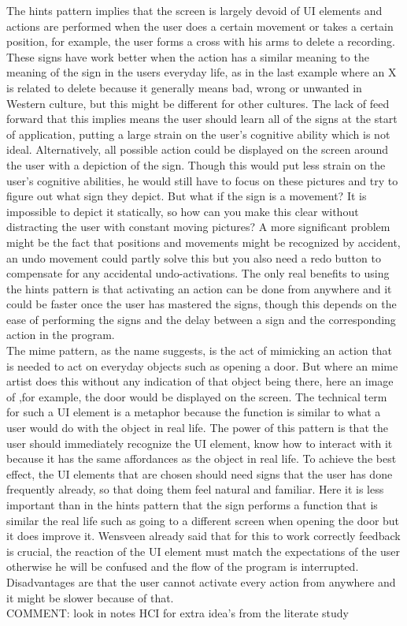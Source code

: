 The hints pattern implies that the screen is largely devoid of UI elements and actions are performed when the user does a certain movement or takes a certain position, for example, the user forms a cross with his arms to delete a recording. These signs have work better when the action has a similar meaning to the meaning of the sign in the users everyday life, as in the last example where an X is related to delete because it generally means bad, wrong or unwanted in Western culture, but this might be different for other cultures. The lack of feed forward that this implies means the user should learn all of the signs at the start of application, putting a large strain on the user's cognitive ability which is not ideal. Alternatively, all possible action could be displayed on the screen around the user with a depiction of the sign. Though this would put less strain on the user's cognitive abilities, he would still have to focus on these pictures and try to figure out what sign they depict. But what if the sign is a movement? It is impossible to depict it statically, so how can you make this clear without distracting the user with constant moving pictures? A more significant problem might be the fact that positions and movements might be recognized by accident, an undo movement could partly solve this but you also need a redo button to compensate for any accidental undo-activations. The only real benefits to using the hints pattern is that activating an action can be done from anywhere and it could be faster once the user has mastered the signs, though this depends on the ease of performing the signs and the delay between a sign and the corresponding action in the program.\\

The mime pattern, as the name suggests, is the act of mimicking an action that is needed to act on everyday objects such as opening a door. But where an mime artist does this without any indication of that object being there, here an image of ,for example, the door would be displayed on the screen. The technical term for such a UI element is a metaphor because the function is similar to what a user would do with the object in real life. The power of this pattern is that the user should immediately recognize the UI element, know how to interact with it because it has the same affordances as the object in real life. To achieve the best effect, the UI elements that are chosen should need signs that the user has done frequently already, so that doing them feel natural and familiar. Here it is less important than in the hints pattern that the sign performs a function that is similar the real life such as going to a different screen when opening the door but it does improve it. Wensveen \cite{Wensveen2004} already said that for this to work correctly feedback is crucial, the reaction of the UI element must match the expectations of the user otherwise he will be confused and the flow of the program is interrupted. Disadvantages are that the user cannot activate every action from anywhere and it might be slower because of that.\\
{\large COMMENT: look in notes HCI for extra idea's from the literate study }\\

